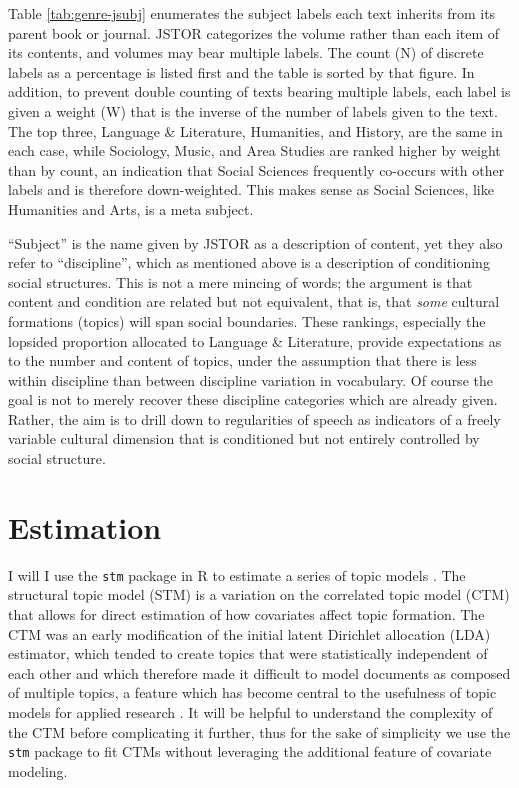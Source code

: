 \documentclass[]{book}
\theoremstyle{definition}
\theoremstyle{definition}
\theoremstyle{definition}
\theoremstyle{remark}
\begin{document}
Table \ref{tab:genre-jsubj} enumerates the subject labels each text
inherits from its parent book or journal. JSTOR categorizes the volume
rather than each item of its contents, and volumes may bear multiple
labels. The count (N) of discrete labels as a percentage is listed first
and the table is sorted by that figure. In addition, to prevent double
counting of texts bearing multiple labels, each label is given a weight
(W) that is the inverse of the number of labels given to the text. The
top three, Language \& Literature, Humanities, and History, are the same
in each case, while Sociology, Music, and Area Studies are ranked higher
by weight than by count, an indication that Social Sciences frequently
co-occurs with other labels and is therefore down-weighted. This makes
sense as Social Sciences, like Humanities and Arts, is a meta subject.

``Subject'' is the name given by JSTOR as a description of content, yet
they also refer to ``discipline'', which as mentioned above is a
description of conditioning social structures. This is not a mere
mincing of words; the argument is that content and condition are related
but not equivalent, that is, that \emph{some} cultural formations
(topics) will span social boundaries. These rankings, especially the
lopsided proportion allocated to Language \& Literature, provide
expectations as to the number and content of topics, under the
assumption that there is less within discipline than between discipline
variation in vocabulary. Of course the goal is not to merely recover
these discipline categories which are already given. Rather, the aim is
to drill down to regularities of speech as indicators of a freely
variable cultural dimension that is conditioned but not entirely
controlled by social structure.

\hypertarget{estimation}{%
\section{Estimation}\label{estimation}}

I will I use the \texttt{stm} package in R to estimate a series of topic
models \citep{Roberts2013structural, Roberts2018stm}. The structural
topic model (STM) is a variation on the correlated topic model (CTM)
that allows for direct estimation of how covariates affect topic
formation. The CTM was an early modification of the initial latent
Dirichlet allocation (LDA) estimator, which tended to create topics that
were statistically independent of each other and which therefore made it
difficult to model documents as composed of multiple topics, a feature
which has become central to the usefulness of topic models for applied
research \citep{Blei2007correlated}. It will be helpful to understand
the complexity of the CTM before complicating it further, thus for the
sake of simplicity we use the \texttt{stm} package to fit CTMs without
leveraging the additional feature of covariate modeling.
\end{document}
